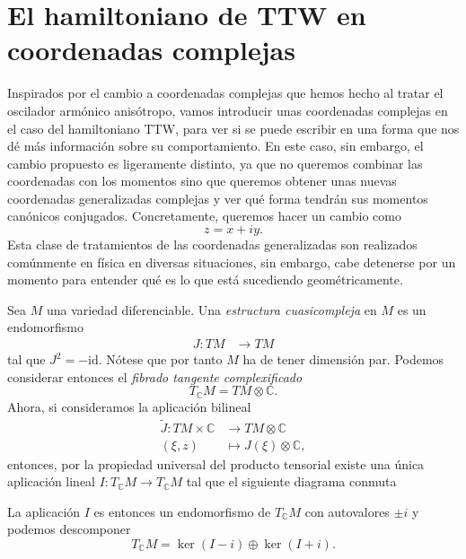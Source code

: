 \documentclass[11pt,a4paper,twoside]{article}
\theoremstyle{definition} \newtheorem{defn}[thm]{Definición}
\theoremstyle{definition} \newtheorem{ejemplo}[thm]{Ejemplo}
\theoremstyle{definition} \newtheorem{ejercicio}[thm]{Ejercicio}
\theoremstyle{remark} \newtheorem*{obs}{Observación}
\def\CC{\mathbb{C}}
\begin{document}
\section{El hamiltoniano de TTW en coordenadas complejas}
Inspirados por el cambio a coordenadas complejas que hemos hecho al tratar el oscilador armónico anisótropo, vamos introducir unas coordenadas complejas en el caso del hamiltoniano TTW, para ver si se puede escribir en una forma que nos dé más información sobre su comportamiento. En este caso, sin embargo, el cambio propuesto es ligeramente distinto, ya que no queremos combinar las coordenadas con los momentos sino que queremos obtener unas nuevas coordenadas generalizadas complejas y ver qué forma tendrán sus momentos canónicos conjugados. Concretamente, queremos hacer un cambio como
\begin{equation}
  z=x+iy.
\end{equation}
Esta clase de tratamientos de las coordenadas generalizadas son realizados comúnmente en física en diversas situaciones, sin embargo, cabe detenerse por un momento para entender qué es lo que está sucediendo geométricamente.

Sea $M$ una variedad diferenciable. Una \emph{estructura cuasicompleja} en $M$ es un endomorfismo
\begin{align*}
  J :TM&\longrightarrow TM
  \end{align*}
  tal que $J^2=-\mathrm{id}$. Nótese que por tanto $M$ ha de tener dimensión par. Podemos considerar entonces el \emph{fibrado tangente complexificado}
  \begin{equation*}
    T_{\CC}M=TM\otimes \CC.
  \end{equation*}
Ahora, si consideramos la aplicación bilineal
\begin{align*}
  \tilde{J} :TM \times \CC&\longrightarrow TM\otimes \CC\\ 
    (\xi,z) &\longmapsto J(\xi)\otimes \CC, 
  \end{align*}
  entonces, por la propiedad universal del producto tensorial existe una única aplicación lineal $I:T_{\CC}M \rightarrow T_{\CC}M$ tal que el siguiente diagrama conmuta
  \begin{center}
   \end{center}
   La aplicación $I$ es entonces un endomorfismo de $T_{\CC}M$ con autovalores $\pm i$ y podemos descomponer
   \begin{equation*}
     T_{\CC}M=\ker(I-i)\oplus \ker(I+i).
   \end{equation*}
\end{document}
